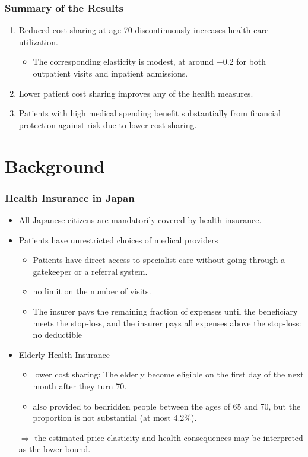 \documentclass[dvipdfmx,11pt]{beamer}
\begin{document}
\begin{frame}\frametitle{Summary of the Results}
  \begin{enumerate}
    \item Reduced cost sharing at age 70 discontinuously increases health care utilization.
    \begin{itemize}
      \item The corresponding elasticity is modest, at around −0.2 for both outpatient visits and inpatient admissions.
    \end{itemize}
    \item Lower patient cost sharing improves any of the health measures.
    \item Patients with high medical spending benefit substantially from financial protection against risk due to lower cost sharing.
  \end{enumerate}
\end{frame}

\section{Background}
\frame{\sectionpage}


\begin{frame}\frametitle{Health Insurance in Japan}
  \begin{itemize}
    \item All Japanese citizens are mandatorily covered by health insurance.
    \item Patients have unrestricted choices of medical providers
    \begin{itemize}
      \item Patients have direct access to specialist care without going through a gatekeeper or a referral system.
      \item no limit on the number of visits.
      \item The insurer pays the remaining fraction of expenses until the beneficiary meets the stop-loss, and the insurer pays all expenses above the stop-loss: no deductible
    \end{itemize}
    \item Elderly Health Insurance
    \begin{itemize}
      \item lower cost sharing: The elderly become eligible on the first day of the next month after they turn 70.
      \item also provided to bedridden people between the ages of 65 and 70, but the proportion is not substantial (at most 4.2\%).
    \end{itemize}
    $\Rightarrow$ the estimated price elasticity and health consequences may be interpreted as the lower bound.
  \end{itemize}
\end{frame}
\end{document}

